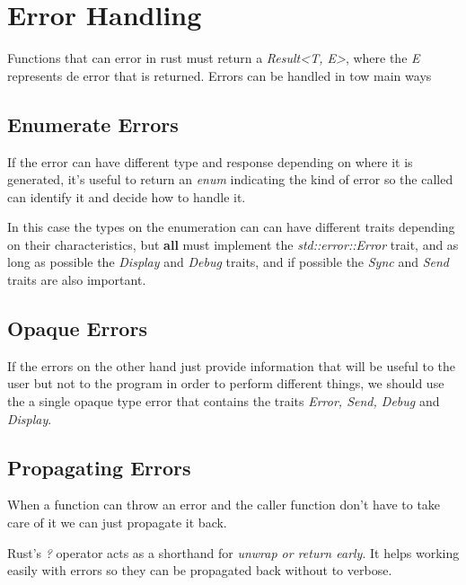 \section{Error Handling}

Functions that can error in rust must return a \textit{Result<T, E>}, where the \textit{E} represents de error that is returned.
Errors can be handled in tow main ways

\subsection{Enumerate Errors}

If the error can have different type and response depending on where it is generated,
it's useful to return an \textit{enum} indicating the kind of error so the called can identify it and decide how to handle it.

In this case the types on the enumeration can can have different traits depending on their characteristics,
but \textbf{all} must implement the \textit{std::error::Error} trait,
and as long as possible the \textit{Display} and \textit{Debug} traits, and if possible the \textit{Sync} and \textit{Send} traits are also important.

\subsection{Opaque Errors}

If the errors on the other hand just provide information that will be useful to the user but not to the program in order to perform different things,
we should use the a single opaque type error that contains the traits \textit{Error, Send, Debug} and \textit{Display}.

\subsection{Propagating Errors}

When a function can throw an error and the caller function don't have to take care of it we can just propagate it back.

Rust's \textit{?} operator acts as a shorthand for \textit{unwrap or return early}.
It helps working easily with errors so they can be propagated back without to verbose.
